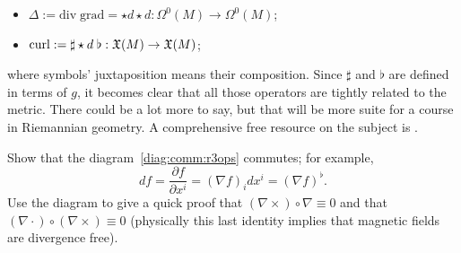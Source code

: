 \begin{example}
\begin{itemize}
		\item $\Delta := \mathrm{div}\; \mathrm{grad} = \star d \star d : \Omega^0(M) \to \Omega^0(M)$;
		\item $\mathrm{curl} := \sharp \star d\; \flat : \mathfrak{X}(M) \to \mathfrak{X}(M)$;
	\end{itemize}
	where symbols' juxtaposition means their composition.
	Since $\sharp$ and $\flat$ are defined in terms of $g$, it becomes clear that all those operators are tightly related to the metric.
	There could be a lot more to say, but that will be more suite for a course in Riemannian geometry.
	A comprehensive free resource on the subject is \cite{book:derivations}.
\end{example}

\begin{exercise}
	Show that the diagram~\eqref{diag:comm:r3ops} commutes; for example,
	\begin{equation}
		df = \frac{\partial f}{\partial x^i} = (\nabla f)_i dx^i = (\nabla f)^\flat.
	\end{equation}
	Use the diagram to give a quick proof that $(\nabla\times)\circ \nabla \equiv 0$ and that $(\nabla\cdot) \circ (\nabla\times) \equiv 0$ (physically this last identity implies that magnetic fields are divergence free).
\end{exercise}

